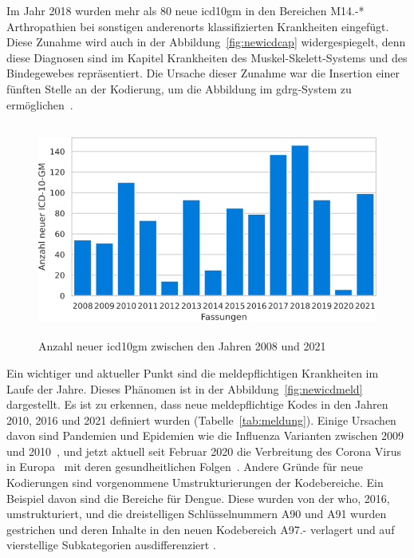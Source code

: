 Im Jahr 2018 wurden mehr als 80 neue \ac{icd10gm} in den Bereichen \textsf{M14.-*} \textsf{Arthropathien bei sonstigen anderenorts klassifizierten Krankheiten} eingefügt. Diese Zunahme wird auch in der Abbildung~\ref{fig:newicdcap} widergespiegelt, denn diese Diagnosen sind im Kapitel \textsf{Krankheiten des Muskel-Skelett-Systems und des Bindegewebes} repräsentiert. Die Ursache dieser Zunahme war die Insertion einer fünften Stelle an der Kodierung, um die Abbildung im \ac{gdrg}-System zu ermöglichen~\cite{musk18}.


\begin{figure}[ht]
	\centering
	\includegraphics[height=7cm]{figures/newicdyear}
	\caption[Neue \acs{icd10gm} pro Jahr]{Anzahl neuer \acs{icd10gm} zwischen den Jahren 2008 und 2021}
	\label{fig:newicdyear}
\end{figure} 

Ein wichtiger und aktueller Punkt sind die meldepflichtigen Krankheiten im Laufe der Jahre. Dieses Phänomen ist in der Abbildung~\ref{fig:newicdmeld} dargestellt. Es ist zu erkennen, dass neue meldepflichtige Kodes in den Jahren 2010, 2016 und 2021 definiert wurden (Tabelle~\ref{tab:meldung}). Einige Ursachen davon sind Pandemien und Epidemien wie die Influenza Varianten zwischen 2009 und 2010~\cite{influenza1, influenza2}, und jetzt aktuell seit Februar 2020 die Verbreitung des Corona Virus in Europa~\cite{corona1} mit deren gesundheitlichen Folgen~\cite{corona2}. Andere Gründe für neue Kodierungen sind vorgenommene Umstrukturierungen der Kodebereiche. Ein Beispiel davon sind die Bereiche für Dengue. Diese wurden von der \ac{who}, 2016, umstrukturiert, und die dreistelligen Schlüsselnummern \textsf{A90} und \textsf{A91} wurden gestrichen und deren Inhalte in den neuen Kodebereich \textsf{A97.-} verlagert und auf vierstellige Subkategorien ausdifferenziert \cite{komm16}.

